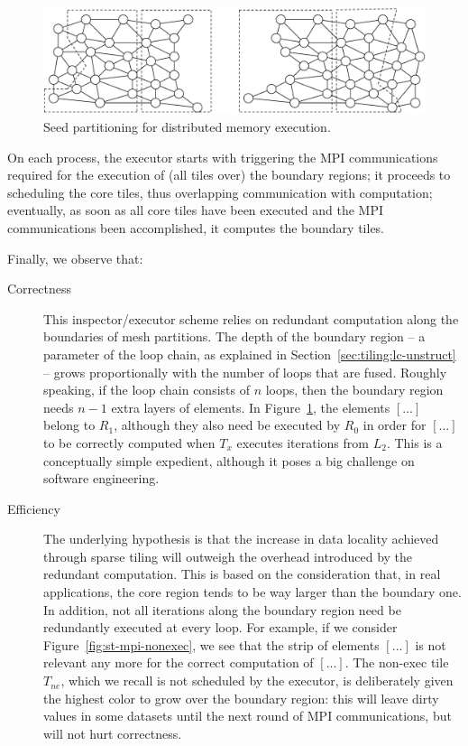 \begin{figure}[h]
\centering
\includegraphics[width=\textwidth]{sparsetiling/figures/base_mesh_doppio.pdf}
\caption{Seed partitioning for distributed memory execution.}
\label{fig:st-mpi-init}
\end{figure}

On each process, the executor starts with triggering the MPI communications required for the execution of (all tiles over) the boundary regions; it proceeds to scheduling the core tiles, thus overlapping communication with computation; eventually, as soon as all core tiles have been executed and the MPI communications been accomplished, it computes the boundary tiles.

Finally, we observe that:
\begin{description}
\item[Correctness] This inspector/executor scheme relies on redundant computation along the boundaries of mesh partitions. The depth of the boundary region -- a parameter of the loop chain, as explained in Section~\ref{sec:tiling:lc-unstruct} -- grows proportionally with the number of loops that are fused. Roughly speaking, if the loop chain consists of $n$ loops, then the boundary region needs $n-1$ extra layers of elements. In Figure~\ref{fig:st-mpi-init}, the elements $[...]$ belong to $R_1$, although they also need be executed by $R_0$ in order for $[...]$ to be correctly computed when $T_x$ executes iterations from $L_2$. This is a conceptually simple expedient, although it poses a big challenge on software engineering. 
\item[Efficiency] The underlying hypothesis is that the increase in data locality achieved through sparse tiling will outweigh the overhead introduced by the redundant computation. This is based on the consideration that, in real applications, the core region tends to be way larger than the boundary one. In addition, not all iterations along the boundary region need be redundantly executed at every loop. For example, if we consider Figure~\ref{fig:st-mpi-nonexec}, we see that the strip of elements $[...]$ is not relevant any more for the correct computation of $[...]$. The non-exec tile $T_{ne}$, which we recall is not scheduled by the executor, is deliberately given the highest color to grow over the boundary region: this will leave dirty values in some datasets until the next round of MPI communications, but will not hurt correctness. 
\end{description}




